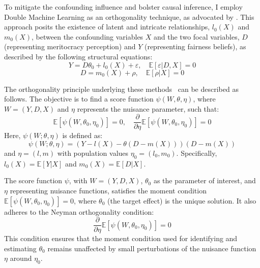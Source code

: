 To mitigate the confounding influence and bolster causal inference, I employ Double Machine Learning as an orthogonality technique, as advocated by \citet{chernozhukov2018double}. This approach posits the existence of latent and intricate relationships, $l_0(X)$ and $m_0(X)$, between the confounding variables $X$ and the two focal variables, $D$ (representing meritocracy perception) and $Y$ (representing fairness beliefs), as described by the following structural equations:
\[
Y = D \theta_0 + l_0(X) + \varepsilon, \quad \mathbb{E}[\varepsilon | D, X] = 0
\]
\[
D = m_0(X) + \rho, \quad \mathbb{E}[\rho | X] = 0
\]

The orthogonality principle underlying these methods~\citep{chernozhukov2018double,belloni2014inference} can be described as follows. The objective is to find a score function $\psi(W, \theta, \eta)$, where $W = (Y, D, X)$ and $\eta$ represents the nuisance parameter, such that:
\[
\mathbb{E}[\psi(W, \theta_0, \eta_0)] = 0, \quad \frac{\partial}{\partial \eta} \mathbb{E}[\psi(W, \theta_0, \eta_0)] = 0
\]
Here, $\psi(W; \theta, \eta)$ is defined as:
\[
\psi(W; \theta, \eta) = \left(Y - l(X) - \theta (D - m(X))\right)(D - m(X))
\]
and $\eta = (l, m)$ with population values $\eta_0 = (l_0, m_0)$. Specifically, $l_0(X) = \mathbb{E}[Y | X]$ and $m_0(X) = \mathbb{E}[D | X]$.

The score function $\psi$, with $W = (Y, D, X)$, $\theta_0$ as the parameter of interest, and $\eta$ representing nuisance functions, satisfies the moment condition $\mathbb{E}[\psi(W, \theta_0, \eta_0)] = 0$, where $\theta_0$ (the target effect) is the unique solution. It also adheres to the Neyman orthogonality condition:
\[
\frac{\partial}{\partial \eta} \mathbb{E}[\psi(W, \theta_0, \eta_0)] = 0
\]
This condition ensures that the moment condition used for identifying and estimating $\theta_0$ remains unaffected by small perturbations of the nuisance function $\eta$ around $\eta_0$.
